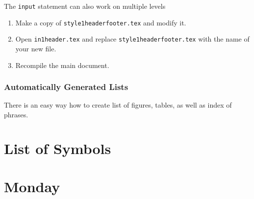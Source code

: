 \documentclass[a4paper,10pt]{report} %
\begin{document}
The \texttt{input} statement can also work on multiple levels
\begin{enumerate}
    \item Make a copy of \texttt{style1headerfooter.tex} and modify it.
    \item Open \texttt{in1header.tex} and replace \texttt{style1headerfooter.tex} with the name of your new file.
    \item Recompile the main document.
\end{enumerate}



\subsection{Automatically Generated Lists}\label{sec:automatic}
There is an easy way how to create list of figures, tables, as well as index of phrases. 

%  


  \tableofcontents 
   \label{contents}
   \listoftables  
   \listoffigures
   \newpage 
   \lstlistoflistings
   \label{listings}  
   \chapter*{List of Symbols}
   
\newpage

\chapter{Monday} \label{chap:monday}
 \pagestyle{fancy}
\end{document}
